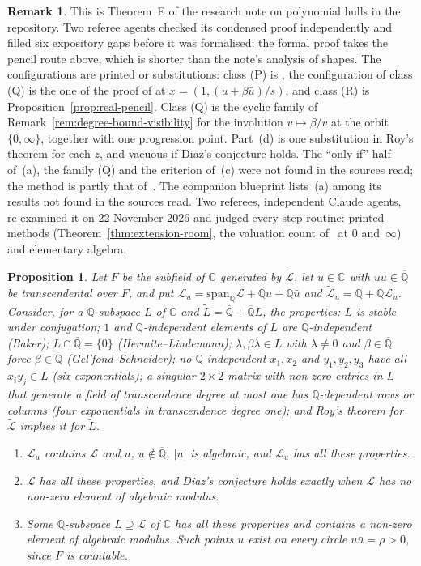 \documentclass[11pt,a4paper]{article}
\theoremstyle{plain}
\newtheorem{proposition}[theorem]{Proposition}
\theoremstyle{definition}
\newtheorem{remark}[theorem]{Remark}
\newcommand{\C}{\mathbb{C}}
\newcommand{\Q}{\mathbb{Q}}
\newcommand{\Alg}{\overline{\mathbb{Q}}}
\newcommand{\Logs}{\mathcal{L}}
\newcommand{\aLogs}{\widetilde{\mathcal{L}}}
\begin{document}
\begin{remark}\label{rem:laurent-hulls-credit}
This is Theorem~E of the research note on polynomial hulls in the repository. Two referee agents checked its condensed
proof independently and filled six expository gaps before it was formalised; the formal proof takes the pencil route
above, which is shorter than the note's analysis of shapes. The configurations are printed or substitutions: class (P)
is \cite[Th\'eor\`eme~7(1)]{diaz-2007}, the configuration of class (Q) is the one of the proof of
\cite[Th\'eor\`eme~2]{diaz-2004} at $x=(1,(u+\beta\bar u)/s)$, and class (R) is Proposition~\ref{prop:real-pencil}. Class
(Q) is the cyclic family of Remark~\ref{rem:degree-bound-visibility} for the involution $v\mapsto\beta/v$ at the orbit
$\{0,\infty\}$, together with one progression point. Part~(d) is one substitution in Roy's theorem for each $z$, and
vacuous if Diaz's conjecture holds. The ``only if'' half of~(a), the family (Q) and the criterion of~(c) were not found
in the sources read; the method is partly that of~\cite[\S7 and Lemma~4]{bachoc-serra-zemor}. The companion blueprint
lists~(a) among its results not found in the sources read. Two referees, independent Claude agents, re-examined it on 22 November 2026 and judged
every step routine: printed methods (Theorem~\ref{thm:extension-room}, the valuation count of~\cite[\S7]{bachoc-serra-zemor} at $0$
and~$\infty$) and elementary algebra.
\end{remark}

\begin{proposition}\label{prop:theorem-D}
Let $F$ be the subfield of $\C$ generated by $\aLogs$, let $u\in\C$ with $u\bar u\in\Alg$ be transcendental over $F$,
and put $\Logs_{u}=\mathrm{span}_{\Q}\Logs+\Q u+\Q\bar u$ and $\aLogs_{u}=\Alg+\Alg\Logs_{u}$. Consider, for a $\Q$-subspace $L$
of $\C$ and $\widetilde L=\Alg+\Alg L$, the properties: $L$ is stable under conjugation; $1$ and $\Q$-independent
elements of $L$ are $\Alg$-independent (Baker); $L\cap\Alg=\{0\}$ (Hermite--Lindemann); $\lambda,\beta\lambda\in L$ with
$\lambda\neq0$ and $\beta\in\Alg$ force $\beta\in\Q$ (Gel'fond--Schneider); no $\Q$-independent $x_{1},x_{2}$ and
$y_{1},y_{2},y_{3}$ have all $x_{i}y_{j}\in L$ (six exponentials); a singular $2\times2$ matrix with non-zero entries in
$L$ that generate a field of transcendence degree at most one has $\Q$-dependent rows or columns (four exponentials in
transcendence degree one); and Roy's theorem for $\aLogs$ implies it for $\widetilde L$.
\begin{enumerate}[label=\textup{(\alph*)}]
\item $\Logs_{u}$ contains $\Logs$ and $u$, $u\notin\Alg$, $|u|$ is algebraic, and $\Logs_{u}$ has all these properties.
\item $\Logs$ has all these properties, and Diaz's conjecture holds exactly when $\Logs$ has no non-zero element of
algebraic modulus.
\item Some $\Q$-subspace $L\supseteq\Logs$ of $\C$ has all these properties and contains a non-zero element of algebraic
modulus. Such points $u$ exist on every circle $u\bar u=\rho>0$, since $F$ is countable.
\end{enumerate}
\end{proposition}
\end{document}
